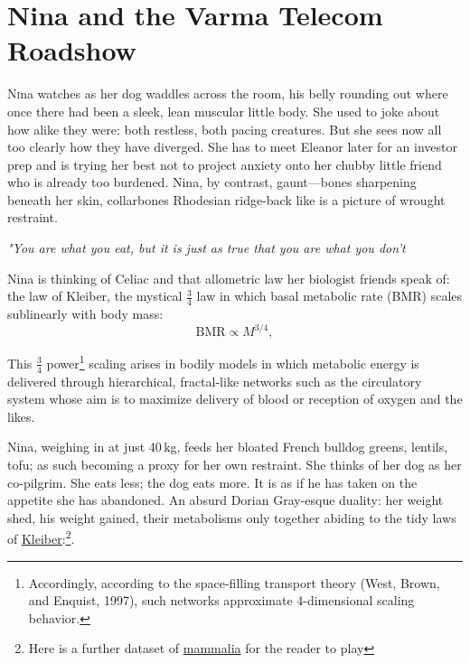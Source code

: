 \chapter{Nina and the Varma Telecom Roadshow}

\lettrine{N}ina watches as her dog waddles across the room, his belly rounding out where once there had been a sleek, lean muscular little body. She used to joke about how alike they were: both restless, both pacing creatures. But she sees now all too clearly how they have diverged. She has to meet Eleanor later for an investor prep and is trying her best not to project anxiety onto her chubby little friend who is already too burdened. Nina, by contrast, gaunt—bones sharpening beneath her skin, collarbones Rhodesian ridge-back like is a picture of wrought restraint.

\smallskip

\textit{"You are what you eat, but it is just as true that you are what you don’t} 

\smallskip

Nina is thinking of Celiac and that allometric law her biologist friends speak of: the law of Kleiber, the mystical \( \tfrac{3}{4} \) law in which  basal metabolic rate (BMR) scales sublinearly with body mass:
\[
\text{BMR} \propto M^{3/4},
\]

This \(\tfrac{3}{4}\) power\footnote{Accordingly, according to the space-filling transport theory (West, Brown, and Enquist, 1997), such networks approximate 4-dimensional scaling behavior.} scaling arises in bodily models in which metabolic energy is delivered through hierarchical, fractal-like networks such as the circulatory system whose aim is to maximize delivery of blood or reception of oxygen and the likes.

\smallskip

Nina, weighing in at just 40\,kg, feeds her bloated French bulldog greens, lentils, tofu; as such becoming a proxy for her own restraint. She thinks of her dog as her co-pilgrim. She eats less; the dog eats more. It is as if he has taken on the appetite she has abandoned. An absurd Dorian Gray-esque duality: her weight shed, his weight gained, their metabolisms only together abiding to the tidy laws of \href{https://colab.research.google.com/drive/1xxmtmJSuziXUUPYG60LAZeY_pc6_tkZ9?usp=sharing}{Kleiber}:\footnote{Here is a further dataset of \href{https://animaldiversity.ummz.umich.edu/quaardvark/search/}{mammalia} for the reader to play}.

